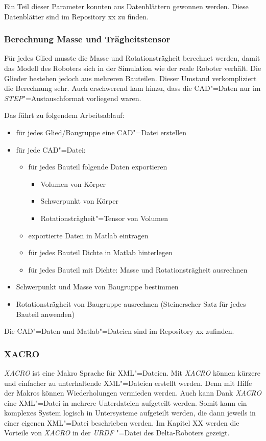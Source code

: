Ein Teil dieser Parameter konnten aus Datenblättern gewonnen werden.
Diese Datenblätter sind im Repository xx zu finden. %

\subsubsection{Berechnung Masse und Trägheitstensor}
Für jedes Glied musste die Masse und Rotationsträgheit berechnet werden, damit das Modell des Roboters sich in der Simulation wie der reale Roboter verhält.
Die Glieder bestehen jedoch aus mehreren Bauteilen.
Dieser Umstand verkompliziert die Berechnung sehr.
Auch erschwerend kam hinzu, dass die CAD"=Daten nur im \textit{STEP}"=Austauschformat vorliegend waren.

Das führt zu folgendem Arbeitsablauf:
\begin{itemize}
\item für jedes Glied/Baugruppe eine CAD"=Datei erstellen
\item für jede CAD"=Datei:
\begin{itemize}
\item für jedes Bauteil folgende Daten exportieren
\begin{itemize}
\item Volumen von Körper
\item Schwerpunkt von Körper
\item Rotationsträgheit"=Tensor von Volumen
\end{itemize}
\item exportierte Daten in Matlab eintragen
\item für jedes Bauteil Dichte in Matlab hinterlegen
\item für jedes Bauteil mit Dichte: Masse und Rotationsträgheit ausrechnen  
\end{itemize}
\item Schwerpunkt und Masse von Baugruppe bestimmen
\item Rotationsträgheit von Baugruppe ausrechnen (Steinerscher Satz für jedes Bauteil anwenden)
\end{itemize}

Die CAD"=Daten und Matlab"=Dateien sind im Repository xx zufinden.

\subsubsection{XACRO}
\label{chap:xacro}
\textit{XACRO} ist eine Makro Sprache für XML"=Dateien. %
Mit \textit{XACRO} können kürzere und einfacher zu unterhaltende XML"=Dateien erstellt werden.
Denn mit Hilfe der Makros können Wiederholungen vermieden werden.
Auch kann Dank \textit{XACRO} eine XML"=Datei in mehrere Unterdateien aufgeteilt werden.
Somit kann ein komplexes System logisch in Untersysteme aufgeteilt werden, die dann jeweils in einer eigenen XML"=Datei beschrieben werden. 
Im Kapitel XX werden die Vorteile von \textit{XACRO} in der \textit{URDF} "=Datei des Delta-Roboters gezeigt.



